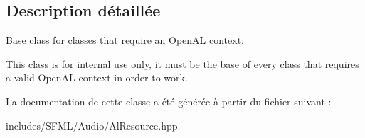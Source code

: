\subsection{Description détaillée}
Base class for classes that require an Open\+AL context. 

This class is for internal use only, it must be the base of every class that requires a valid Open\+AL context in order to work. 

La documentation de cette classe a été générée à partir du fichier suivant \+:\begin{DoxyCompactItemize}
\item 
includes/\+S\+F\+M\+L/\+Audio/Al\+Resource.\+hpp\end{DoxyCompactItemize}
